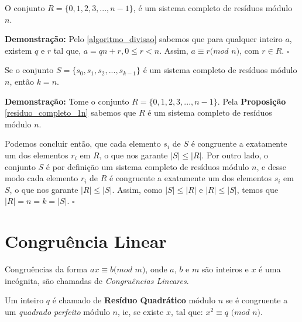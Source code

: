 \begin{proposition}\label{residuo_completo_1n}
O conjunto $R = \{0, 1, 2, 3,...,n-1\}$, é um sistema completo de resíduos módulo $n$.
\end{proposition}
\textbf{Demonstração:}
Pelo \autoref{algoritmo_divisao} sabemos que para qualquer inteiro $a$, existem $q$ e $r$ tal que, $a = qn + r, 0 \leq r < n$. Assim, $a\equiv r(mod$ $n)$, com $r \in R$. $\square$
\\

\begin{theorem}
Se o conjunto $S = \{s_0, s_1, s_2, ..., s_{k-1}\}$ é um sistema completo de resíduos módulo $n$, então $k=n$.
\end{theorem}
\textbf{Demonstração:}
Tome o conjunto $R = \{0, 1, 2, 3,...,n-1\}$. Pela \textbf{Proposição} \autoref{residuo_completo_1n} sabemos que $R$ é um sistema completo de resíduos módulo $n$.

Podemos concluir então, que cada elemento $s_i$ de $S$ é congruente a exatamente um dos elementos $r_i$ em $R$, o que nos garante $|S| \leq |R|$. 
Por outro lado, o conjunto $S$ é por definição um sistema completo de resíduos módulo $n$, e desse modo cada elemento $r_i$ de $R$ é congruente a exatamente um dos elementos $s_i$ em $S$, o que nos garante $|R| \leq |S|$.
Assim, como $|S| \leq |R|$ e $|R| \leq |S|$, temos que $|R| = n = k = |S|$. $\square$
\\




\section{Congruência Linear}

\begin{definition}
Congruências da forma $ax \equiv b (mod$ $m)$, onde $a$, $b$ e $m$ são inteiros e $x$ é uma incógnita, são chamadas de \textit{Congruências Lineares}.
\newline
\end{definition}


\begin{definition}\label{def_residuo_quadratico}
Um inteiro $q$ é chamado de \textbf{Resíduo Quadrático} módulo $n$ se é congruente a um \textit{quadrado perfeito} módulo $n$, ie, se existe $x$, tal que:
$x^2 \equiv q$ $(mod$ $n)$. 
\newline 
\end{definition}

